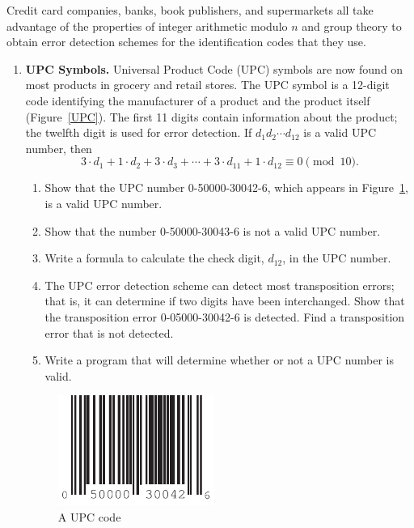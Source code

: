  
{\small
Credit card companies, banks, book publishers, and supermarkets all
take advantage of the properties of integer arithmetic modulo $n$ and
group theory to obtain error detection schemes for the identification
codes that they use. 
\begin{enumerate}
 
 
\item
{\bf UPC Symbols.}
Universal Product
Code (UPC) symbols are now found on most
products in grocery and retail stores. The UPC symbol is a 12-digit
code identifying the manufacturer of a product and the product itself
(Figure~\ref{UPC}). The first 11 digits contain information about the
product; the twelfth digit is used for error detection. If $d_1 d_2
\cdots d_{12}$ is a valid UPC number, then  
$$
3 \cdot d_1 + 1 \cdot d_2 + 3 \cdot d_3 + \cdots + 3 \cdot
d_{11} + 1 \cdot d_{12} \equiv 0 \pmod{10}.
$$
\begin{enumerate}
 
\item
Show that the UPC number  0-50000-30042-6, which appears in
Figure~\ref{groups_figure_3}, is a valid UPC number. 
 
\item
Show that the number 0-50000-30043-6 is not a valid UPC number.
 
\item
Write a  formula to calculate the check digit, $d_{12}$, in the UPC number. 
 
\item
The  UPC error detection scheme can detect most transposition errors; that is, it can determine if two digits have been interchanged.  Show that the transposition error 0-05000-30042-6 is detected.  Find a transposition error that is not detected. 
 
\item
Write a program that will determine whether or not a UPC number is valid. 
 
\end{enumerate}
 
\begin{figure}
\begin{center}
\centerline {
\includegraphics[width=2in]{UPCcode}
}
\end{center}
\caption{A UPC code}
\label{groups_figure_3}
\end{figure}


\end{enumerate}}
